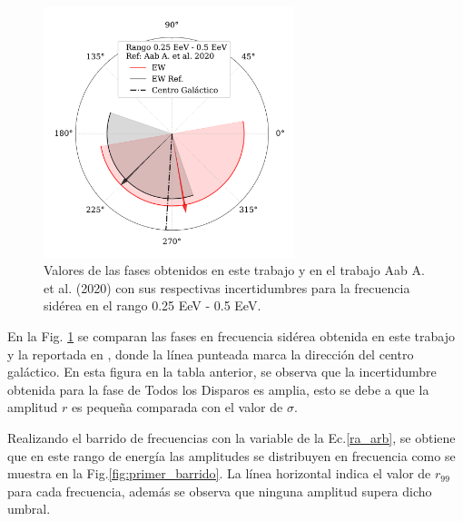 \begin{figure}[H]
    \begin{small}
        \begin{center}
            \vspace*{-1. cm}
            \includegraphics[width=0.65\textwidth]{phase_primer_bin_v3.pdf}
            \vspace*{-1 cm}
        \end{center}
        \caption{Valores de las fases obtenidos en este trabajo y en el trabajo Aab A. et al. (2020) \cite{Aab_2020} con sus respectivas incertidumbres para la frecuencia sidérea en el  rango 0.25 EeV - 0.5 EeV.}
        \label{fig:primer}
    \end{small}
\end{figure}

En la Fig. \ref{fig:primer} se comparan las  fases en frecuencia sidérea obtenida en este trabajo y la reportada en \cite{Aab_2020}, donde la línea punteada marca la dirección del centro galáctico.  En esta figura en la tabla anterior, se observa que la incertidumbre obtenida para la fase de Todos los Disparos es amplia, esto se debe a que la amplitud $r$ es pequeña comparada con el valor de $\sigma$. 


Realizando el barrido de frecuencias con la variable de la Ec.\ref{ra_arb}, se obtiene que en este rango de energía las amplitudes se  distribuyen en frecuencia como se muestra en la Fig.\ref{fig:primer_barrido}. La línea horizontal indica el valor de $r_{99}$ para cada frecuencia, además se observa que ninguna amplitud supera dicho umbral.



